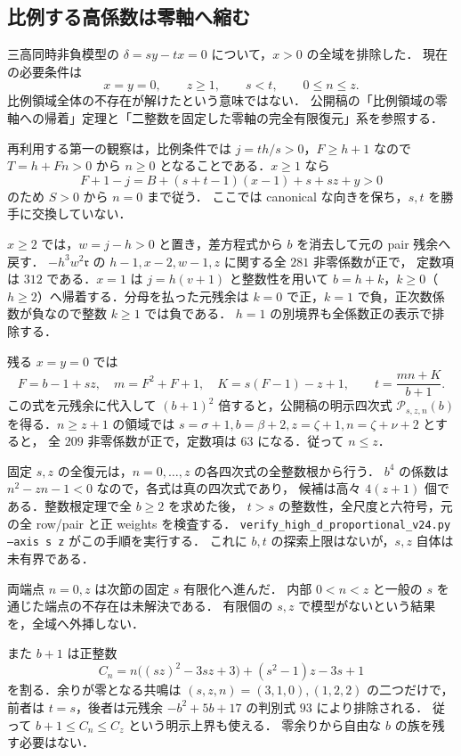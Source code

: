 \subsection{比例する高係数は零軸へ縮む}
\label{nhp24:section}

三高同時非負模型の $\delta=sy-tx=0$ について，$x>0$ の全域を排除した．
現在の必要条件は
\[
 x=y=0,\qquad z\ge1,\qquad s<t,\qquad 0\le n\le z.
\]
比例領域全体の不存在が解けたという意味ではない．
公開稿の「比例領域の零軸への帰着」定理と「二整数を固定した零軸の完全有限復元」系を参照する．

再利用する第一の観察は，比例条件では $j=th/s>0$，$F\ge h+1$ なので
$T=h+Fn>0$ から $n\ge0$ となることである．$x\ge1$ なら
\[
 F+1-j=B+(s+t-1)(x-1)+s+sz+y>0
\]
のため $S>0$ から $n=0$ まで従う．
ここでは canonical な向きを保ち，$s,t$ を勝手に交換していない．

$x\ge2$ では，$w=j-h>0$ と置き，差方程式から $b$ を消去して元の pair 残余へ戻す．
$-h^3w^2\mathfrak r$ の $h-1,x-2,w-1,z$ に関する全 $281$ 非零係数が正で，
定数項は $312$ である．$x=1$ は $j=h(v+1)$ と整数性を用いて
$b=h+k$，$k\ge0$（$h\ge2$）へ帰着する．分母を払った元残余は
$k=0$ で正，$k=1$ で負，正次数係数が負なので整数 $k\ge1$ では負である．
$h=1$ の別境界も全係数正の表示で排除する．

残る $x=y=0$ では
\[
 F=b-1+sz,\quad m=F^2+F+1,\quad K=s(F-1)-z+1,\qquad
 t=\frac{mn+K}{b+1}.
\]
この式を元残余に代入して $(b+1)^2$ 倍すると，公開稿の明示四次式
$\mathcal P_{s,z,n}(b)$ を得る．$n\ge z+1$ の領域では
$s=\sigma+1,b=\beta+2,z=\zeta+1,n=\zeta+\nu+2$ とすると，
全 $209$ 非零係数が正で，定数項は $63$ になる．従って $n\le z$．

固定 $s,z$ の全復元は，$n=0,\ldots,z$ の各四次式の全整数根から行う．
$b^4$ の係数は $n^2-zn-1<0$ なので，各式は真の四次式であり，
候補は高々 $4(z+1)$ 個である．整数根定理で全 $b\ge2$ を求めた後，
$t>s$ の整数性，全尺度と六符号，元の全 row/pair と正 weights を検査する．
\nolinkurl{verify_high_d_proportional_v24.py} \texttt{--axis s z} がこの手順を実行する．
これに $b,t$ の探索上限はないが，$s,z$ 自体は未有界である．

両端点 $n=0,z$ は次節の固定 $s$ 有限化へ進んだ．
内部 $0<n<z$ と一般の $s$ を通じた端点の不存在は未解決である．
有限個の $s,z$ で模型がないという結果を，全域へ外挿しない．

また $b+1$ は正整数
\[
 C_n=n\bigl((sz)^2-3sz+3\bigr)+(s^2-1)z-3s+1
\]
を割る．余りが零となる共鳴は $(s,z,n)=(3,1,0),(1,2,2)$ の二つだけで，
前者は $t=s$，後者は元残余 $-b^2+5b+17$ の判別式 $93$ により排除される．
従って $b+1\le C_n\le C_z$ という明示上界も使える．
零余りから自由な $b$ の族を残す必要はない．
